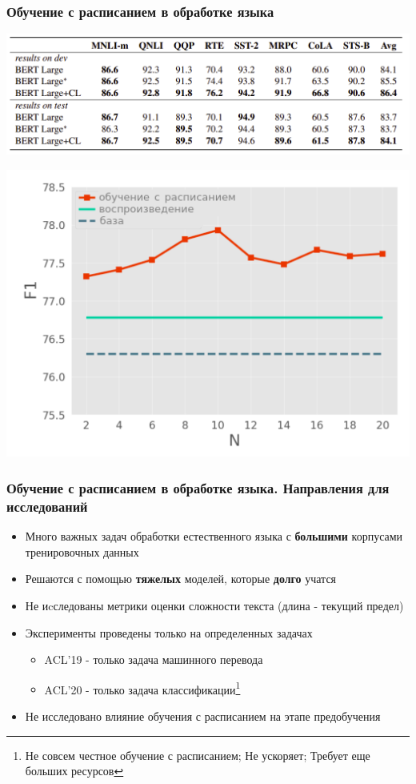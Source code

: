 \documentclass{beamer}
\begin{document}
\begin{frame}
	\frametitle{Обучение с расписанием в обработке языка}
	\begin{center}
		\includegraphics[scale=0.3]{acl20_results}
	\end{center}

	\begin{center}
		\includegraphics[scale=0.45]{acl20_results2}
	\end{center}

\end{frame}

\begin{frame}
	\frametitle{Обучение с расписанием в обработке языка. Направления для исследований}
	\begin{itemize}
		\item Много важных задач обработки естественного языка с {\bf большими} корпусами тренировочных данных
		\item Решаются с помощью {\bf тяжелых} моделей, которые {\bf долго} учатся
		\item Не иcследованы метрики оценки сложности текста (длина - текущий предел)
		\item Эксперименты проведены только на определенных задачах
			\begin{itemize}
				\item ACL'19 - только задача машинного перевода
				\item ACL'20 - только задача классификации\footnote[1]{Не совсем честное обучение с расписанием; Не ускоряет; Требует еще больших ресурсов}
			\end{itemize}
		\item Не исследовано влияние обучения с расписанием на этапе предобучения
	\end{itemize}
\end{frame}
\end{document}
